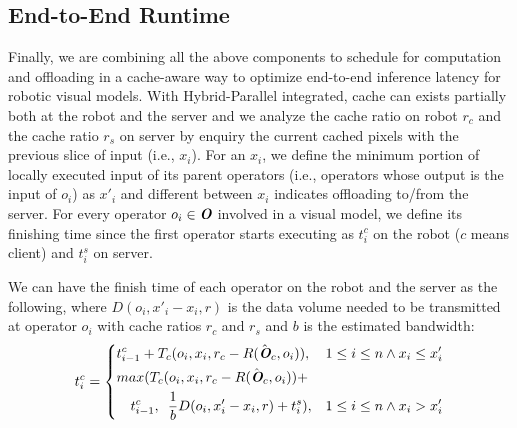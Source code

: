 
\subsection{End-to-End Runtime\label{sec:schedule}}
Finally, we are combining all the above components to schedule for computation and offloading in a cache-aware way to optimize end-to-end inference latency for robotic visual models.
With Hybrid-Parallel integrated, cache can exists partially both at the robot and the server and we analyze the cache ratio on robot $r_c$ and the cache ratio $r_s$ on server by enquiry the current cached pixels with the previous slice of input (i.e., $x_i$).
For an $x_i$, we define the minimum portion of locally executed input of its parent operators (i.e., operators whose output is the input of $o_i$) as $x'_i$ and different between $x_i$ indicates offloading to/from the server.
For every operator $o_i \in \textit{\textbf{O}}$ involved in a visual model, we define its finishing time since the first operator starts executing as $t_i^{c}$ on the robot ($c$ means client) and $t_i^{s}$ on server.

We can have the finish time of each operator on the robot and the server as the following, where $D(o_i, x'_i-x_i,r)$ is the data volume needed to be transmitted at operator $o_i$ with cache ratios $r_c$ and $r_s$ and $b$ is the estimated bandwidth:
\begin{equation*}
    t_i^{c} = \left\{
        \begin{aligned}
            &t_{i-1}^{c} + T_c(o_i, x_i, r_c-R(\hat{\textit{\textbf{O}}}_c, o_i)),&&1\le i\le n \land x_i\le x'_i \\
            &max(T_c(o_i, x_i, r_c-R(\hat{\textit{\textbf{O}}}_c, o_i)) +\\
            & \enspace \enspace t_{i-1}^{c}, \enspace \frac{1}{b}D(o_i, x'_i-x_i,r)+ t_i^{s}),&&1\le i\le n \land x_i >x'_i
        \end{aligned}
    \right.
\end{equation*}

